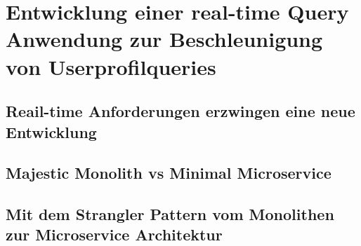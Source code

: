 \chapter{Entwicklung einer real-time Query Anwendung zur Beschleunigung von Userprofilqueries}

\section{Reail-time Anforderungen erzwingen eine neue Entwicklung}

\section{Majestic Monolith vs Minimal Microservice}

\section{Mit dem Strangler Pattern vom Monolithen zur Microservice Architektur}